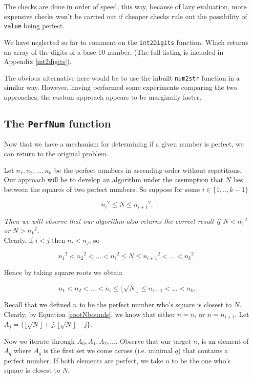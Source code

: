 \documentclass[10pt]{article}
\begin{document}
 The checks are done in order of speed, this way, because of lazy evaluation, more expensive checks won't be carried out if cheaper checks rule out the possibility of \texttt{value} being perfect.
 
We have neglected so far to comment on the \texttt{int2Digits} function. Which returns an array of the digits of a base 10 number. (The full listing is included in Appendix \ref{int2digits}).
 
 The obvious alternative here would be to use the inbuilt \texttt{num2str} function in a similar way. However, having performed some experiments comparing the two approaches, the custom approach appears to be marginally faster.
 
\subsection{The \texttt{PerfNum} function}

Now that we have a mechanism for determining if a given number is perfect, we can return to the original problem.

Let $n_1, n_2, ..., n_k$ be the perfect numbers in ascending order without repetitions. Our approach will be to develop an algorithm under the assumption that $N$ lies between the squares of two perfect numbers. So suppose  for some $i \in \{ 1,..,k-1 \}$

$$ {n_i}^2 \leq N \leq {n_{i+1}}^2. $$

\emph{Then we will observe that our algorithm also returns the correct result if  $N < {n_1}^2$ or $N > {n_k}^2$.} \\

Clearly, if $i<j \text{ then } n_i < n_j$, so

$$ {n_1}^2 < {n_2}^2 < ... < {n_i} ^2 \leq N \leq {n_{i+1}}^2 < ... < {n_k}^2.$$

Hence by taking square roots we obtain

\begin{equation} \label{rootNbounds}
 n_1 < n_2 < ... <  n_i \leq \lfloor \sqrt{N} \rfloor \leq n_{i+1} < ... < n_k.
\end{equation}

Recall that we defined $n$ to be the perfect number who's square is closest to $N$. Clearly, by Equation \ref{rootNbounds}, we know that either $n = n_i$ or $n = n_{i+1}$. Let $A_j =\{  \lfloor \sqrt{N} \rfloor + j,  \lfloor \sqrt{N} \rfloor  - j \} .$

Now we iterate through $A_0, A_1, A_2,...$. Observe that our target $n$, is an element of $A_q$ where $A_q$ is the first set we come across (i.e. minimal $q$) that contains a perfect number. If both elements are perfect, we take $n$ to be the one who's square is closest to $N$.
\end{document}
